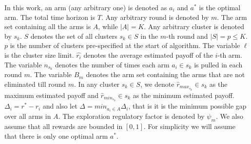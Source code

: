 In this work, an arm (any arbitrary one) is denoted as $a_{i}$ and $a^{*}$ is the optimal arm. The total time horizon is $T$. Any arbitrary round is denoted by $m$. The arm set containing all the arms is $A$, while $|A|=K$. Any arbitrary cluster is denoted by $s_{k}$. $S$ denotes the set of all clusters $s_{k}\in S$ in the $m$-th round and $|S|=p\leq K$. $p$ is the number of clusters pre-specified at the start of algorithm. The variable $\ell$ is the cluster size limit.
$\hat{r_i}$ denotes the average estimated payoff of the $i$-th arm. The variable $n_{s_{k}}$ denotes the number of times each arm $a_{i}\in s_{k}$ is pulled in each round $m$. The variable $B_{m}$ denotes the arm set containing the arms that are not eliminated till round $m$.
	In any cluster $s_{k}\in S$, we denote $\hat{r}_{max_{s_{k}}}\in s_{k}$ as the maximum estimated payoff and $\hat{r}_{min_{s_{k}}}\in s_{k}$ as the minimum estimated payoff. $\Delta_{i}=r^{*}-r_{i}$ and also let $\Delta=min_{a_{i}\in A}\Delta_{i}$, that is it is the minimum possible gap over all arms in $A$. The exploration regulatory factor is denoted by $\psi_{m}$. %
We also assume that all rewards are bounded in $[0,1]$. For simplicity we will assume that there is only one optimal arm $a^{*}$.
